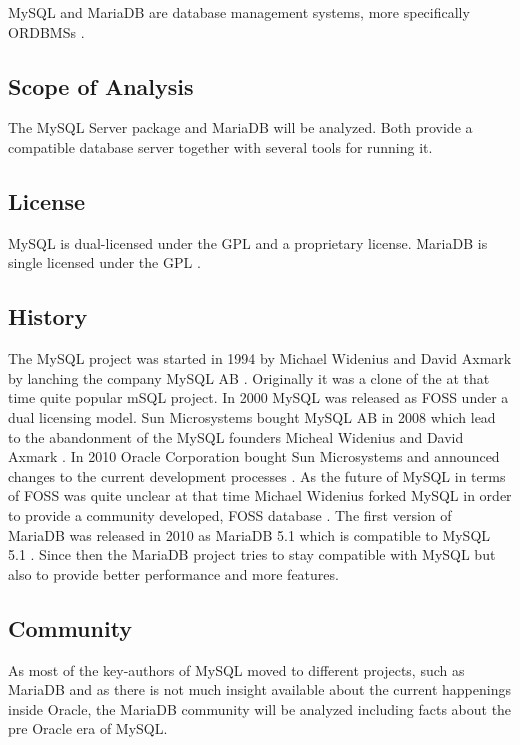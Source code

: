 MySQL and MariaDB are database management systems, more specifically
\acp{ORDBMS} \cite{MySQLAbout}.

\subsection{Scope of Analysis}

The MySQL Server package and MariaDB will be analyzed. Both provide a
compatible database server together with several tools for running it.

\subsection{License}

MySQL is dual-licensed under the \ac{GPL} and a proprietary license. MariaDB is
single licensed under the \ac{GPL} \cite{MySQLLicense}.

\subsection{History}

The MySQL project was started in 1994 by Michael Widenius and David Axmark by
lanching the company MySQL AB \cite{MySQLHistory}. Originally it was a clone of
the at that time quite popular mSQL project. In 2000 MySQL was released as
\ac{FOSS} under a dual licensing model. Sun Microsystems bought MySQL AB in
2008 which lead to the abandonment of the MySQL founders Micheal Widenius and
David Axmark \cite{MySQLSun}. In 2010 Oracle Corporation bought Sun
Microsystems and announced changes to the current development processes
\cite{MySQLOracle}. As the future of MySQL in terms of \ac{FOSS} was quite
unclear at that time Michael Widenius forked MySQL in order to provide a
community developed, \ac{FOSS} database \cite{MySQLBehind}. The first version
of MariaDB was released in 2010 as MariaDB 5.1 which is compatible to MySQL 5.1
\cite{MySQLMariaDB5.1}. Since then the MariaDB project tries to stay compatible
with MySQL but also to provide better performance and more features.

\subsection{Community}

As most of the key-authors of MySQL moved to different projects, such as
MariaDB and as there is not much insight available about the current happenings
inside Oracle, the MariaDB community will be analyzed including facts about the
pre Oracle era of MySQL.

